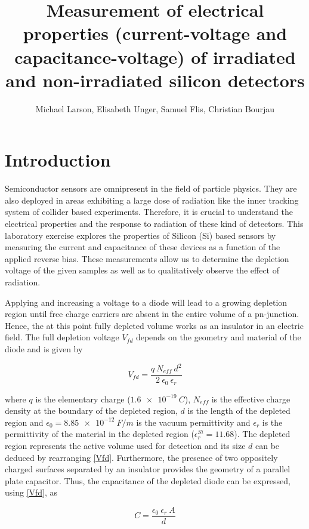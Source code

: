 \documentclass[11pt,a4paper]{report}
\title{Measurement of electrical properties (current-voltage and capacitance-voltage) of irradiated and non-irradiated silicon detectors}
\author{Michael Larson, Elisabeth Unger, Samuel Flis, Christian Bourjau}
\begin{document}
\maketitle

\section*{Introduction}
\label{sec:introduction}

Semiconductor sensors are omnipresent in the field of particle physics.
They are also deployed in areas exhibiting a large dose of radiation like the inner tracking system of collider based experiments.
Therefore, it is crucial to understand the electrical properties and the response to radiation of these kind of detectors.
This laboratory exercise explores the  properties of Silicon (Si) based sensors by measuring the current and capacitance of these devices as a function of the applied reverse bias.
These measurements allow us to determine the depletion voltage of the given samples as well as to qualitatively observe the effect of radiation.

Applying and increasing a voltage to a diode will lead to a growing depletion region until free charge carriers are absent in the entire volume of a pn-junction. Hence, the at this point fully depleted volume works as an insulator in an electric field. The full depletion voltage $V_{fd}$ depends on the geometry and material of the diode and is given by 

\begin{equation}
  \label{Vfd}
  V_{fd} = \frac{q ~ N_{eff} ~ d^2}{2 ~ \epsilon_0 ~ \epsilon_r}
\end{equation}

where $q$ is the elementary charge ($\SI{1.6e-19}{C}$), $N_{eff}$ is the effective charge density at the boundary of the depleted region, $d$ is the length of the depleted region and $\epsilon_0 = \SI{8.85e-12}{F/m}$ is the vacuum permittivity and $\epsilon_r$ is the permittivity of the material in the depleted region ($\epsilon_r^{Si} = 11.68$).
The depleted region represents the active volume used for detection and its size $d$ can be deduced by rearranging \eqref{Vfd}. 
Furthermore, the presence of two oppositely charged surfaces separated by an insulator provides the geometry of a parallel plate capacitor. Thus, the capacitance of the depleted diode can be expressed, using \eqref{Vfd}, as

\begin{equation}
  \label{C}
  C = \frac{\epsilon_{0} ~ \epsilon_{r} ~ A}{d}
\end{equation}
\end{document}
